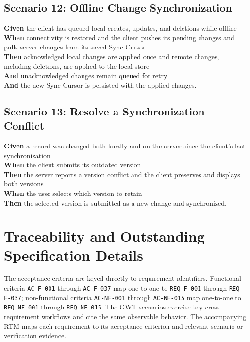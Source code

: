 \documentclass[11pt,a4paper]{article}
\begin{document}
\subsection*{Scenario 12: Offline Change Synchronization}
\textbf{Given} the client has queued local creates, updates, and deletions while offline\\
\textbf{When} connectivity is restored and the client pushes its pending changes and pulls server changes from its saved Sync Cursor\\
\textbf{Then} acknowledged local changes are applied once and remote changes, including deletions, are applied to the local store\\
\textbf{And} unacknowledged changes remain queued for retry\\
\textbf{And} the new Sync Cursor is persisted with the applied changes.

\subsection*{Scenario 13: Resolve a Synchronization Conflict}
\textbf{Given} a record was changed both locally and on the server since the client's last synchronization\\
\textbf{When} the client submits its outdated version\\
\textbf{Then} the server reports a version conflict and the client preserves and displays both versions\\
\textbf{When} the user selects which version to retain\\
\textbf{Then} the selected version is submitted as a new change and synchronized.

\section{Traceability and Outstanding Specification Details}
The acceptance criteria are keyed directly to requirement identifiers. Functional criteria \texttt{AC-F-001} through \texttt{AC-F-037} map one-to-one to \texttt{REQ-F-001} through \texttt{REQ-F-037}; non-functional criteria \texttt{AC-NF-001} through \texttt{AC-NF-015} map one-to-one to \texttt{REQ-NF-001} through \texttt{REQ-NF-015}. The GWT scenarios exercise key cross-requirement workflows and cite the same observable behavior. The accompanying RTM maps each requirement to its acceptance criterion and relevant scenario or verification evidence.
\end{document}
